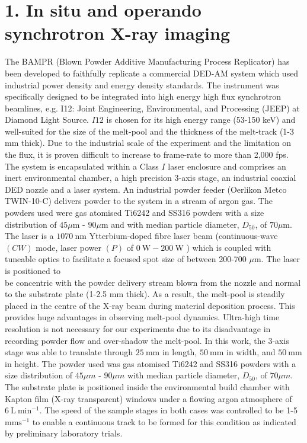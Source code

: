 \documentclass[10pt]{article}
\begin{document}
\section*{1. In situ and operando synchrotron X-ray imaging}
The BAMPR (Blown Powder Additive Manufacturing Process Replicator) has been developed to faithfully replicate a commercial DED-AM system which used industrial power density and energy density standards. The instrument was specifically designed to be integrated into high energy high flux synchrotron beamlines, e.g. I12: Joint Engineering, Environmental, and Processing (JEEP) at Diamond Light Source. $I 12$ is chosen for its high energy range (53-150 keV) and well-suited for the size of the melt-pool and the thickness of the melt-track (1-3 $\mathrm{mm}$ thick). Due to the industrial scale of the experiment and the limitation on the flux, it is proven difficult to increase to frame-rate to more than 2,000 fps. The system is encapsulated within a Class $I$ laser enclosure and comprises an inert environmental chamber, a high precision 3-axis stage, an industrial coaxial DED nozzle and a laser system. An industrial powder feeder (Oerlikon Metco TWIN-10-C) delivers powder to the system in a stream of argon gas. The powders used were gas atomised Ti6242 and SS316 powders with a size distribution of $45 \mu \mathrm{m}$ - $90 \mu \mathrm{m}$ and with median particle diameter, $D_{50}$, of $70 \mu \mathrm{m}$. The laser is a $1070 \mathrm{~nm}$ Ytterbium-doped fibre laser beam (continuous-wave $(C W)$ mode, laser power $(P)$ of $0 \mathrm{~W}-200 \mathrm{~W}$ ) which is coupled with tuneable optics to facilitate a focused spot size of between 200-700 $\mu \mathrm{m}$. The laser is positioned to\\
be concentric with the powder delivery stream blown from the nozzle and normal to the substrate plate (1-2.5 $\mathrm{mm}$ thick). As a result, the melt-pool is steadily placed in the centre of the X-ray beam during material deposition process. This provides huge advantages in observing melt-pool dynamics. Ultra-high time resolution is not necessary for our experiments due to its disadvantage in recording powder flow and over-shadow the melt-pool. In this work, the 3-axis stage was able to translate through $25 \mathrm{~mm}$ in length, $50 \mathrm{~mm}$ in width, and $50 \mathrm{~mm}$ in height. The powder used was gas atomised Ti6242 and SS316 powders with a size distribution of $45 \mu m$ - $90 \mu m$ with median particle diameter, $D_{50}$, of $70 \mu m$. The substrate plate is positioned inside the environmental build chamber with Kapton film (X-ray transparent) windows under a flowing argon atmosphere of $6 \mathrm{~L} \mathrm{~min}^{-1}$. The speed of the sample stages in both cases was controlled to be 1-5 $\mathrm{mm} \mathrm{s}^{-1}$ to enable a continuous track to be formed for this condition as indicated by preliminary laboratory trials.
\end{document}
